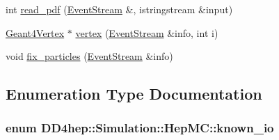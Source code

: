 \begin{DoxyCompactItemize}
\item 
int \hyperlink{namespace_d_d4hep_1_1_simulation_1_1_hep_m_c_a599dd238f1b1dc069a14f3bf57c09cfb}{read\_\-pdf} (\hyperlink{class_d_d4hep_1_1_simulation_1_1_hep_m_c_1_1_event_stream}{EventStream} \&, istringstream \&input)
\item 
\hyperlink{class_d_d4hep_1_1_simulation_1_1_geant4_vertex}{Geant4Vertex} $\ast$ \hyperlink{namespace_d_d4hep_1_1_simulation_1_1_hep_m_c_a3a13a13dbe2dce0cfbea9607895abf14}{vertex} (\hyperlink{class_d_d4hep_1_1_simulation_1_1_hep_m_c_1_1_event_stream}{EventStream} \&info, int i)
\item 
void \hyperlink{namespace_d_d4hep_1_1_simulation_1_1_hep_m_c_a07b61ea67e59ff0e064a976336f7f3f3}{fix\_\-particles} (\hyperlink{class_d_d4hep_1_1_simulation_1_1_hep_m_c_1_1_event_stream}{EventStream} \&info)
\end{DoxyCompactItemize}


\subsection{Enumeration Type Documentation}
\hypertarget{namespace_d_d4hep_1_1_simulation_1_1_hep_m_c_abd57f9534b4e3e74fa2e5f25525d452c}{
\subsubsection[{known\_\-io}]{\setlength{\rightskip}{0pt plus 5cm}enum {\bf DD4hep::Simulation::HepMC::known\_\-io}}}
\label{namespace_d_d4hep_1_1_simulation_1_1_hep_m_c_abd57f9534b4e3e74fa2e5f25525d452c}


